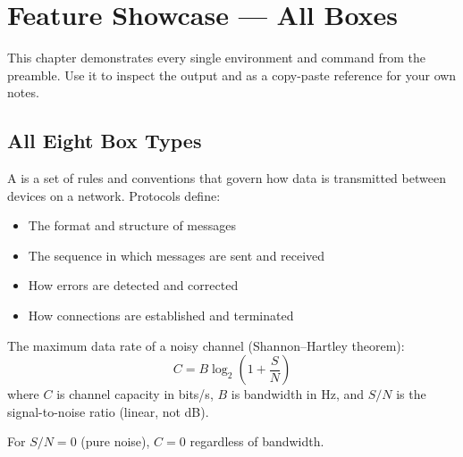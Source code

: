 \documentclass[main.tex]{subfiles}
\begin{document}

\chapter{Feature Showcase — All Boxes}

This chapter demonstrates every single environment and command from the preamble.
Use it to inspect the output and as a copy-paste reference for your own notes.

\section{All Eight Box Types}

\begin{definitionbox}
A  is a set of rules and conventions that govern how
data is transmitted between devices on a network. Protocols define:
\begin{itemize}
    \item The format and structure of messages
    \item The sequence in which messages are sent and received
    \item How errors are detected and corrected
    \item How connections are established and terminated
\end{itemize}
\end{definitionbox}

\vspace{6pt}

\begin{formulabox}
The maximum data rate of a noisy channel (Shannon--Hartley theorem):
\[
    C = B \log_2\!\left(1 + \frac{S}{N}\right)
\]
where $C$ is channel capacity in bits/s, $B$ is bandwidth in Hz,
and $S/N$ is the signal-to-noise ratio (linear, not dB).

\Note For $S/N = 0$ (pure noise), $C = 0$ regardless of bandwidth.
\end{formulabox}
\end{document}
